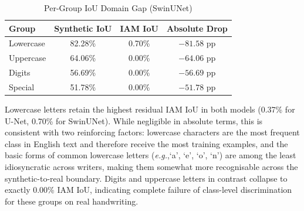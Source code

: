 \documentclass[a4paper,11pt]{article}
\newcommand{\eg}{\emph{e.g.},\xspace}
\begin{document}
\begin{table}[H]
\centering
\caption{Per-Group IoU Domain Gap (SwinUNet)}
\label{tab:group_gap_swin}
\begin{tabular}{lccc}
\toprule
\textbf{Group} & \textbf{Synthetic IoU} & \textbf{IAM IoU} & \textbf{Absolute Drop} \\
\midrule
Lowercase & 82.28\% & 0.70\% & $-81.58$ pp \\
Uppercase & 64.06\% & 0.00\% & $-64.06$ pp \\
Digits    & 56.69\% & 0.00\% & $-56.69$ pp \\
Special   & 51.78\% & 0.00\% & $-51.78$ pp \\
\bottomrule
\end{tabular}
\end{table}

Lowercase letters retain the highest residual IAM IoU in both models (0.37\% for U-Net,
0.70\% for SwinUNet). While negligible in absolute terms, this is consistent with two
reinforcing factors: lowercase characters are the most frequent class in English text and
therefore receive the most training examples, and the basic forms of common lowercase
letters (\eg `a', `e', `o', `n') are among the least idiosyncratic across writers, making
them somewhat more recognisable across the synthetic-to-real boundary. Digits and
uppercase letters in contrast collapse to exactly 0.00\% IAM IoU, indicating complete
failure of class-level discrimination for these groups on real handwriting.
\end{document}
